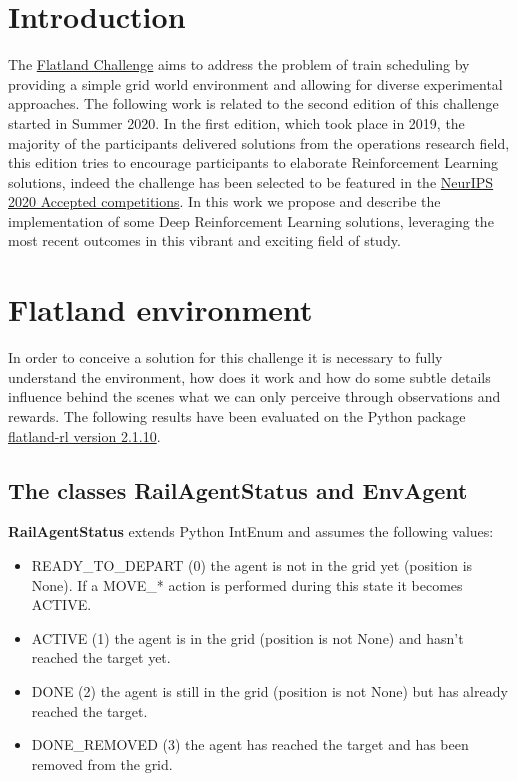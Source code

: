 \documentclass[11pt, a4paper, hidelinks]{report}
\begin{document}
\chapter{Introduction}

The \href{https://www.aicrowd.com/challenges/neurips-2020-flatland-challenge/}{Flatland Challenge} aims to address the problem of train scheduling by providing a simple grid world environment and allowing for diverse experimental approaches.
The following work is related to the second edition of this challenge started in Summer 2020.
In the first edition, which took place in 2019, the majority of the participants delivered solutions from the operations research field, this edition tries to encourage participants to elaborate Reinforcement Learning solutions, indeed the challenge has been selected to be featured in the \href{https://neurips.cc/Conferences/2020/CompetitionTrack}{NeurIPS 2020 Accepted competitions}.
In this work we propose and describe the implementation of some Deep Reinforcement Learning solutions, leveraging the most recent outcomes in this vibrant and exciting field of study.

\chapter{Flatland environment}\label{ch:flatland-environment}

In order to conceive a solution for this challenge it is necessary to fully understand the environment, how does it work and how do some subtle details influence behind the scenes what we can only perceive through observations and rewards.
The following results have been evaluated on the Python package \href{https://pypi.org/project/flatland-rl/}{flatland-rl version 2.1.10}.

\section{The classes RailAgentStatus and EnvAgent}\label{sec:the-classes-railagentstatus-and-envagent}

\textbf{RailAgentStatus} extends Python IntEnum and assumes the following values:
\begin{itemize}
	\item READY\_TO\_DEPART (0) the agent is not in the grid yet (position is None).
If a MOVE\_* action is performed during this state it becomes ACTIVE\@.
	\item ACTIVE (1) the agent is in the grid (position is not None) and hasn't reached the target yet.
	\item DONE (2) the agent is still in the grid (position is not None) but has already reached the target.
	\item DONE\_REMOVED (3) the agent has reached the target and has been removed from the grid.
\end{itemize}
\end{document}
